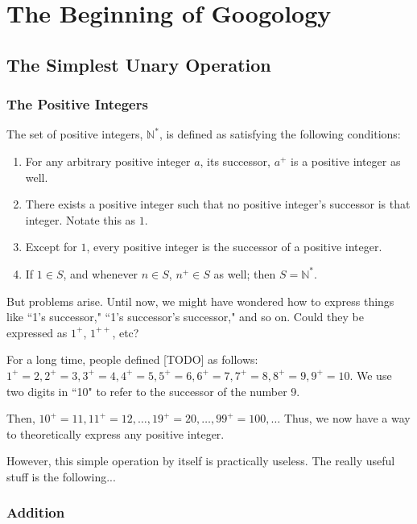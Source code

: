 \chapter{The Beginning of Googology} %

\section{The Simplest Unary Operation}

\subsection{The Positive Integers}
The set of positive integers, $\mathbb{N}^*$, is defined as satisfying the following conditions:
\begin{enumerate}
	\item For any arbitrary positive integer $a$, its successor, $a^+$ is a positive integer as well.
	\item There exists a positive integer such that no positive integer's successor is that integer. Notate this as $1$.
	\item Except for $1$, every positive integer is the successor of a positive integer.
	\item If $1 \in S$, and whenever $n \in S$, $n^+ \in S$ as well; then $S = \mathbb{N}^*$.
\end{enumerate}

But problems arise. Until now, we might have wondered how to express things like ``1's successor," ``1's successor's successor," and so on.
Could they be expressed as $1^+$, $1^{++}$, etc?

For a long time, people defined [TODO] as follows: $1^+=2, 2^+=3, 3^+=4, 4^+=5, 5^+=6, 6^+=7, 7^+=8, 8^+=9, 9^+=10.$ 
We use two digits in ``10" to refer to the successor of the number 9.

Then, $10^+=11, 11^+=12, \ldots, 19^+=20, \ldots, 99^+=100, \ldots$
Thus, we now have a way to theoretically express any positive integer.

However, this simple operation by itself is practically useless. The really useful stuff is the following...

\subsection{Addition}

